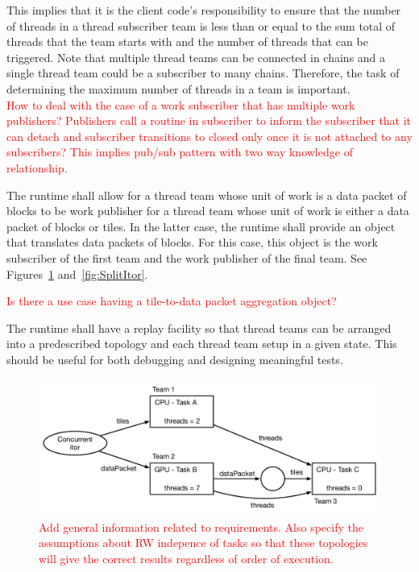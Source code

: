 \documentclass{article}
\begin{document}
This implies that it is the client code's responsibility to ensure that the
number of threads in a thread subscriber team is less than or equal to the sum
total of threads that the team starts with and the number of threads that can be
triggered.  Note that multiple thread teams can be connected in chains and a
single thread team could be a subscriber to many chains.  Therefore, the task of
determining the maximum number of threads in a team is important.\\

\textcolor{red}{How to deal with the case of a work subscriber that has
multiple work publishers?  Publishers call a routine in subscriber to inform the
subscriber that it can detach and subscriber transitions to closed only once it
is not attached to any subscribers?  This implies pub/sub pattern with two way
knowledge of relationship.}\\

\begin{req}
The runtime shall allow for a thread team whose unit of work is a data packet of
blocks to be work publisher for a thread team whose unit of work is either a
data packet of blocks or tiles.  In the latter case, the runtime shall provide
an object that translates data packets of blocks.  For this case, this object is
the work subscriber of the first team and the work publisher of the final team.
See Figures~\ref{fig:ConcurrentItor} and~\ref{fig:SplitItor}.
\end{req}

\textcolor{red}{Is there a use case having a tile-to-data packet aggregation
object?}

\begin{req}
The runtime shall have a replay facility so that thread teams can be arranged
into a predescribed topology and each thread team setup in a given state.  This
should be useful for both debugging and designing meaningful tests.
\end{req}

\begin{figure}[!ht]
\begin{center}
\includegraphics[width=5.0in]{ConcurrentItorExample.pdf}
\caption[]{\textcolor{red}{Add general information related to requirements.
Also specify the assumptions about RW indepence of tasks so that these
topologies will give the correct results regardless of order of execution.}}
\label{fig:ConcurrentItor}
\end{center}
\end{figure}
\end{document}
